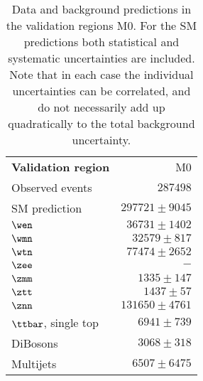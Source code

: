 \begin{table}
\begin{center}
\setlength{\tabcolsep}{0.0pc}
{\small
    \begin{tabular*}{\textwidth}{@{\extracolsep{\fill}}lr}
  \noalign{\smallskip}\hline\noalign{\smallskip}
  {\bf  Validation region}           & M0              \\[-0.05cm]
    Observed events          & $287498$                    \\ \hline
    SM prediction         & $297721 \pm 9045$              \\ \hline
    $\wen$         & $36731 \pm 1402$              \\
    $\wmn$         & $32579 \pm 817$              \\
    $\wtn$         & $77474 \pm 2652$              \\
    $\zee$         & $-$              \\
    $\zmm$         & $1335 \pm 147$              \\
    $\ztt$         & $1437 \pm 57$              \\
    $\znn$         & $131650 \pm 4761$              \\
    $\ttbar$, single top         & $6941 \pm 739$              \\
    DiBosons         & $3068 \pm 318$              \\
    Multijets         & $6507 \pm 6475$              \\ \hline
  \end{tabular*}
}
\end{center}
    \caption{Data and background predictions in the validation regions M0. 
      For the SM predictions both statistical and systematic uncertainties are included.
        Note that in each case the individual 
        uncertainties can be correlated, and do not necessarily add up quadratically to the total background uncertainty.
    }
\label{tab:ValidationRegion}
\end{table}

